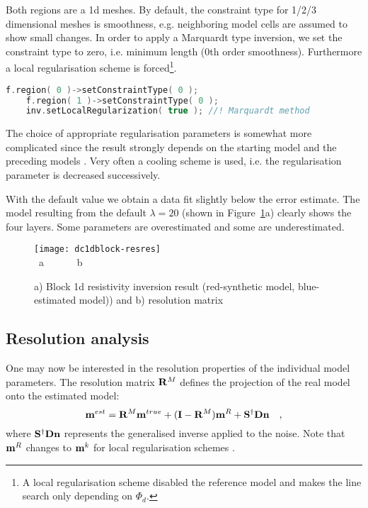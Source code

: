 Both regions are a 1d meshes.
By default, the constraint type for 1/2/3 dimensional meshes is smoothness, e.g. neighboring model cells are assumed to show small changes.
In order to apply a Marquardt type inversion, we set the constraint type to zero, i.e. minimum length (0th order smoothness). Furthermore a local regularisation scheme is forced\footnote{A local regularisation scheme disabled the reference model and makes the line search only depending on $\Phi_d$.}.
\begin{lstlisting}[language=C++]
    f.region( 0 )->setConstraintType( 0 );
    f.region( 1 )->setConstraintType( 0 );
    inv.setLocalRegularization( true ); //! Marquardt method
\end{lstlisting}

The choice of appropriate regularisation parameters is somewhat more complicated since the result strongly depends on the starting model and the preceding models \citep{guentherdiss}.
Very often a cooling scheme is used, i.e. the regularisation parameter is decreased successively.

With the default value we obtain a data fit slightly below the error estimate.
The model resulting from the default $\lambda=20$ (shown in Figure~\ref{fig:dc1dblock-resres}a) clearly shows the four layers. Some parameters are overestimated and some are underestimated.

\begin{figure}[htbp]
\centering\texttt{[image: dc1dblock-resres]}\\[-3ex]
~\hfill a\hfill ~ \hfill ~~~~~b \hfill ~ \hfill ~ \hfill ~
\caption{a) Block 1d resistivity inversion result (red-synthetic model, blue-estimated model)) and b) resolution matrix}\label{fig:dc1dblock-resres}
\end{figure}

\subsection{Resolution analysis}\label{sec:dc1dresolution}
One may now be interested in the resolution properties of the individual model parameters.
The resolution matrix ${\bf R}^M$ defines the projection of the real model onto the estimated model:
\begin{equation}
	\mathbf{m}^{est} = {\bf R}^M \mathbf{m}^{true} + (\mathbf{I} - {\bf R}^M) \mathbf{m}^R + \mathbf{S}^\dagger\mathbf{D}\mathbf{n}\quad,
\end{equation}
\citep{guentherdiss} where $\mathbf{S}^\dagger\mathbf{D}\mathbf{n}$ represents the generalised inverse applied to the noise.
Note that $\mathbf{m}^R$ changes to $\mathbf{m}^k$ for local regularisation schemes \citep{friedel03}.

